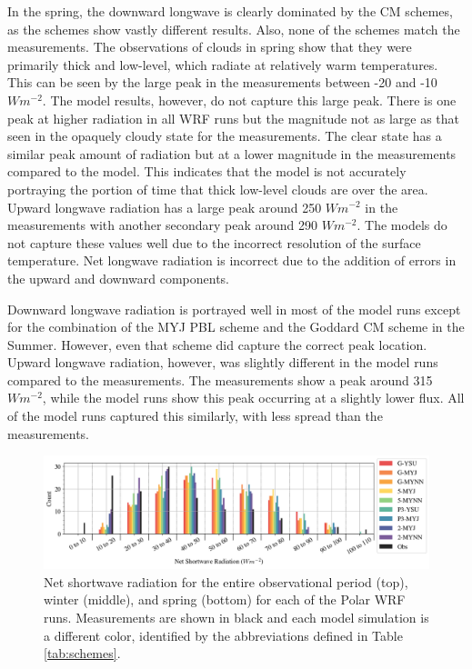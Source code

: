 In the spring, the downward longwave is clearly dominated by the CM schemes, as the schemes show vastly different results. Also, none of the schemes match the measurements. The observations of clouds in spring show that they were primarily thick and low-level, which radiate at relatively warm temperatures. This can be seen by the large peak in the measurements between -20 and -10 $Wm^{-2}$. The model results, however, do not capture this large peak. There is one peak at higher radiation in all WRF runs but the magnitude not as large as that seen in the opaquely cloudy state for the measurements. The clear state has a similar peak amount of radiation but at a lower magnitude in the measurements compared to the model. This indicates that the model is not accurately portraying the portion of time that thick low-level clouds are over the area. Upward longwave radiation has a large peak around 250 $Wm^{-2}$ in the measurements with another secondary peak around 290 $Wm^{-2}$. The models do not capture these values well due to the incorrect resolution of the surface temperature. Net longwave radiation is incorrect due to the addition of errors in the upward and downward components. 

Downward longwave radiation is portrayed well in most of the model runs except for the combination of the MYJ PBL scheme and the Goddard CM scheme in the Summer. However, even that scheme did capture the correct peak location. Upward longwave radiation, however, was slightly different in the model runs compared to the measurements. The measurements show a peak around 315 $Wm^{-2}$, while the model runs show this peak occurring at a slightly lower flux. All of the model runs captured this similarly, with less spread than the measurements.

\begin{figure}[h]
    \centering
    \includegraphics[width=1\linewidth]{figures/chapter3/WRF_NetSW_Histo.png}
    \caption[Polar WRF simulated net shortwave radiation histograms.]{Net shortwave radiation for the entire observational period (top), winter (middle), and spring (bottom) for each of the Polar WRF runs. Measurements are shown in black and each model simulation is a different color, identified by the abbreviations defined in Table \ref{tab:schemes}.}
    \label{fig:wrf_netsw}
\end{figure}

